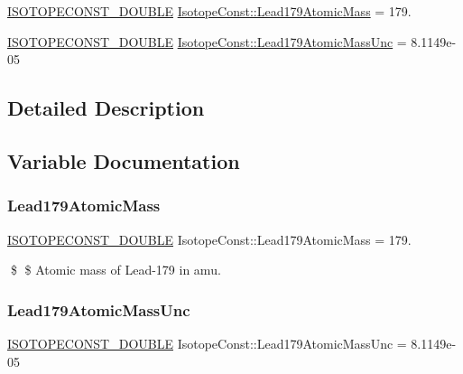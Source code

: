 \begin{DoxyCompactItemize}
\item 
\mbox{\hyperlink{group___isotope_const-_macros_ga8f45a7272ce02c0b4c65c44636ed719a}{I\+S\+O\+T\+O\+P\+E\+C\+O\+N\+S\+T\+\_\+\+D\+O\+U\+B\+LE}} \mbox{\hyperlink{group___isotope_const-_lead-_pb179_ga1732dcfe938bad9f7ba79ecfceb7877f}{Isotope\+Const\+::\+Lead179\+Atomic\+Mass}} = 179.
\item 
\mbox{\hyperlink{group___isotope_const-_macros_ga8f45a7272ce02c0b4c65c44636ed719a}{I\+S\+O\+T\+O\+P\+E\+C\+O\+N\+S\+T\+\_\+\+D\+O\+U\+B\+LE}} \mbox{\hyperlink{group___isotope_const-_lead-_pb179_ga1d3a1d83e3a64a9f41d4c2a0ed90fb02}{Isotope\+Const\+::\+Lead179\+Atomic\+Mass\+Unc}} = 8.\+1149e-\/05
\end{DoxyCompactItemize}


\subsection{Detailed Description}


\subsection{Variable Documentation}
\mbox{\label{group___isotope_const-_lead-_pb179_ga1732dcfe938bad9f7ba79ecfceb7877f}} 
\subsubsection{\texorpdfstring{Lead179\+Atomic\+Mass}{Lead179AtomicMass}}
{\footnotesize\ttfamily \mbox{\hyperlink{group___isotope_const-_macros_ga8f45a7272ce02c0b4c65c44636ed719a}{I\+S\+O\+T\+O\+P\+E\+C\+O\+N\+S\+T\+\_\+\+D\+O\+U\+B\+LE}} Isotope\+Const\+::\+Lead179\+Atomic\+Mass = 179.}

\$ \$ Atomic mass of Lead-\/179 in amu. \mbox{\label{group___isotope_const-_lead-_pb179_ga1d3a1d83e3a64a9f41d4c2a0ed90fb02}} 
\subsubsection{\texorpdfstring{Lead179\+Atomic\+Mass\+Unc}{Lead179AtomicMassUnc}}
{\footnotesize\ttfamily \mbox{\hyperlink{group___isotope_const-_macros_ga8f45a7272ce02c0b4c65c44636ed719a}{I\+S\+O\+T\+O\+P\+E\+C\+O\+N\+S\+T\+\_\+\+D\+O\+U\+B\+LE}} Isotope\+Const\+::\+Lead179\+Atomic\+Mass\+Unc = 8.\+1149e-\/05}

